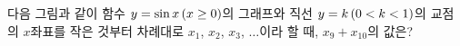 다음 그림과 같이 함수 $y=\sin x\mkern3mu (x\ge 0)$의 그래프와 직선 $y=k\mkern3mu (0<k<1)$의 교점의 $x$좌표를 작은 것부터 차례대로 $x_1$, $x_2$, $x_3$, $\ldots$이라 할 때, $x_9+x_{10}$의 값은?
\par\smallskip\begin{center}\resizebox{\ifdim\width>\linewidth\linewidth\else\width\fi}{!}{}\end{center}
\dmchoicesauto{}{$13\pi$}{$15\pi$}{$17\pi$}{$19\pi$}{$21\pi$}
